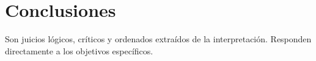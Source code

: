 \chapter{Conclusiones}
Son juicios lógicos, críticos y ordenados extraídos de la interpretación. Responden directamente a los objetivos específicos.

